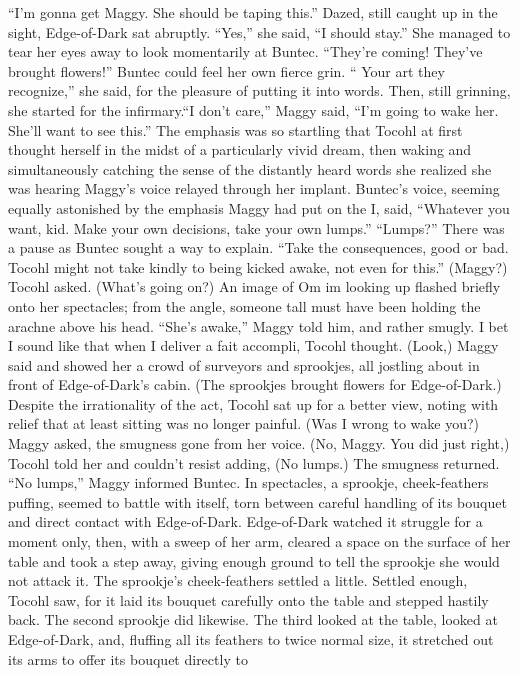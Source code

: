 \documentclass[9pt]{article}
\begin{document}
“I’m gonna get Maggy. She should be taping this.”
Dazed, still caught up in the sight, Edge-of-Dark sat abruptly. “Yes,” she said, “I should stay.” She
managed to tear her eyes away to look momentarily at Buntec. “They’re coming! They’ve brought
flowers!”
Buntec could feel her own fierce grin. “ Your art they recognize,” she said, for the pleasure of putting
it into words. Then, still grinning, she started for the infirmary.“I don’t care,” Maggy said, “I’m going to wake her. She’ll want to see this.” The emphasis was so
startling that Tocohl at first thought herself in the midst of a particularly vivid dream, then waking and
simultaneously catching the sense of the distantly heard words she realized she was hearing Maggy’s
voice relayed through her implant.
Buntec’s voice, seeming equally astonished by the emphasis Maggy had put on the I, said,
“Whatever you want, kid. Make your own decisions, take your own lumps.”
“Lumps?”
There was a pause as Buntec sought a way to explain. “Take the consequences, good or bad.
Tocohl might not take kindly to being kicked awake, not even for this.”
(Maggy?) Tocohl asked. (What’s going on?)
An image of Om im looking up flashed briefly onto her spectacles; from the angle, someone tall must
have been holding the arachne above his head. “She’s awake,” Maggy told him, and rather smugly. I bet
I sound like that when I deliver a fait accompli, Tocohl thought.
(Look,) Maggy said and showed her a crowd of surveyors and sprookjes, all jostling about in front
of Edge-of-Dark’s cabin. (The sprookjes brought flowers for Edge-of-Dark.)
Despite the irrationality of the act, Tocohl sat up for a better view, noting with relief that at least sitting
was no longer painful.
(Was I wrong to wake you?) Maggy asked, the smugness gone from her voice.
(No, Maggy. You did just right,) Tocohl told her and couldn’t resist adding, (No lumps.)
The smugness returned. “No lumps,” Maggy informed Buntec.
In spectacles, a sprookje, cheek-feathers puffing, seemed to battle with itself, torn between careful
handling of its bouquet and direct contact with Edge-of-Dark.
Edge-of-Dark watched it struggle for a moment only, then, with a sweep of her arm, cleared a space
on the surface of her table and took a step away, giving enough ground to tell the sprookje she would not
attack it. The sprookje’s cheek-feathers settled a little. Settled enough, Tocohl saw, for it laid its bouquet
carefully onto the table and stepped hastily back.
The second sprookje did likewise. The third looked at the table, looked at Edge-of-Dark, and,
fluffing all its feathers to twice normal size, it stretched out its arms to offer its bouquet directly to
\end{document}
